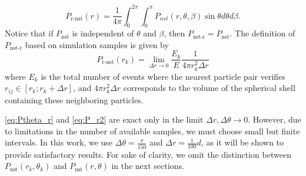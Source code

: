 \begin{equation}
    P_\text{r-nst}(r) = \frac{1}{4\pi }\int_{0}^{2\pi}\int_{0}^{\pi} P_{nst}(r,\theta ,\beta) \sin\theta d\theta d\beta.
    \label{eq:P_r}
\end{equation}
Notice that if $P_\text{nst}$ is independent of $\theta$ and $\beta$, then $P_\text{nst-r} = P_\text{nst}$. 
The definition of $P_\text{nst-r}$ based on simulation samples is given by 
\begin{equation}
    P_\text{r-nst}(r_k)
    =
    \lim_{\Delta r \to 0}
    \frac{E_k}{E}
    \frac{1}{4\pi  r_k^2  \Delta r }
    \label{eq:P_r2}
\end{equation}
where $E_k$ is the total number of events where the nearest particle pair verifies $r_{ij} \in [r_k ; r_k + \Delta r]$, and $4\pi  r_k^2  \Delta r$ corresponds to the volume of the spherical shell containing these neighboring particles. 

\ref{eq:Ptheta_r} and \ref{eq:P_r2} are exact only in the limit $\Delta r,\Delta \theta  \to 0$. 
However, due to limitations in the number of available samples, we must choose small but finite intervals.
In this work, we use $\Delta \theta = \frac{\pi}{150}$ and $\Delta r = \frac{1}{100}d$, as it will be shown to provide satisfactory results. 
For sake of clarity, we omit the distinction between $P_\text{nst}(r_k,\theta_k)$ and $P_\text{nst}(r,\theta)$ in the next sections. 